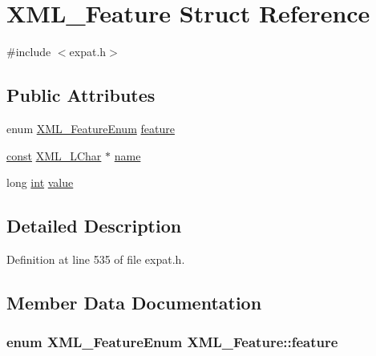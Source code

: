 \hypertarget{struct_x_m_l___feature}{}\section{X\+M\+L\+\_\+\+Feature Struct Reference}
\label{struct_x_m_l___feature}


{\ttfamily \#include $<$expat.\+h$>$}

\subsection*{Public Attributes}
\begin{DoxyCompactItemize}
\item 
enum \hyperlink{amiga_2include_2libraries_2expat_8h_a3003d8415d1239ab78a8adfce6a34a8e}{X\+M\+L\+\_\+\+Feature\+Enum} \hyperlink{struct_x_m_l___feature_ae66421def7745a794da86612a9464b48}{feature}
\item 
\hyperlink{getopt1_8c_a2c212835823e3c54a8ab6d95c652660e}{const} \hyperlink{amiga_2include_2libraries_2expat_8h_a728c9a3114531eaeb70753ba4601c418}{X\+M\+L\+\_\+\+L\+Char} $\ast$ \hyperlink{struct_x_m_l___feature_a2ea400d7b861801d99c6d69a0713fa0c}{name}
\item 
long \hyperlink{xmltok_8h_a5a0d4a5641ce434f1d23533f2b2e6653}{int} \hyperlink{struct_x_m_l___feature_a4d50cc5cb43a39f49435d0e81a4189dd}{value}
\end{DoxyCompactItemize}


\subsection{Detailed Description}


Definition at line 535 of file expat.\+h.



\subsection{Member Data Documentation}
\subsubsection[{\texorpdfstring{feature}{feature}}]{\setlength{\rightskip}{0pt plus 5cm}enum {\bf X\+M\+L\+\_\+\+Feature\+Enum} X\+M\+L\+\_\+\+Feature\+::feature}\hypertarget{struct_x_m_l___feature_ae66421def7745a794da86612a9464b48}{}\label{struct_x_m_l___feature_ae66421def7745a794da86612a9464b48}


